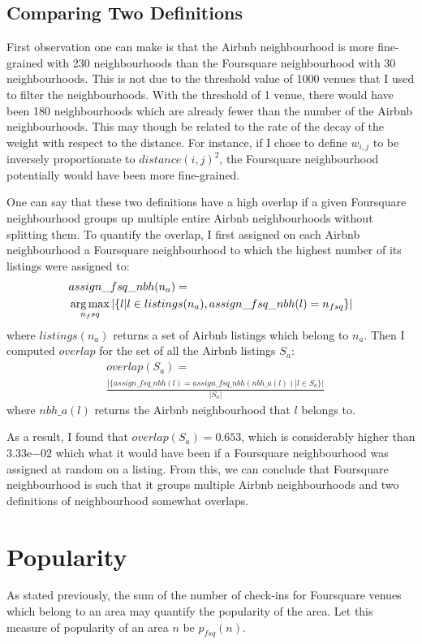 \subsection{Comparing Two Definitions}
First observation one can make is that the Airbnb neighbourhood is more fine-grained with 230 neighbourhoods than the Foursquare neighbourhood with 30 neighbourhoods. This is not due to the threshold value of 1000 venues that I used to filter the neighbourhoods. With the threshold of 1 venue, there would have been 180 neighbourhoods which are already fewer than the number of the Airbnb neighbourhoods. This may though be related to the rate of the decay of the weight with respect to the distance. For instance, if I chose to define $w_{i, j}$ to be inversely proportionate to $distance(i, j)^2$, the Foursquare neighbourhood potentially would have been more fine-grained.

One can say that these two definitions have a high overlap if a given Foursquare neighbourhood groups up multiple entire Airbnb neighbourhoods without splitting them. To quantify the overlap, I first assigned on each Airbnb neighbourhood a Foursquare neighbourhood to which the highest number of its listings were assigned to:
\begin{align*}
&assign\_fsq\_nbh(n_{a}) = \\
&\operatorname*{arg\,max}_{n_fsq} | \{ l | l \in listings(n_{a}), assign\_fsq\_nbh(l) = n_{fsq}\} |
\end{align*}
where $listings(n_{a})$ returns a set of Airbnb listings which belong to $n_{a}$. Then I computed $overlap$ for the set of all the Airbnb listings $S_a$:
\begin{align*}
&overlap(S_a) = \\
& \frac{|\{ assign\_fsq\_nbh(l) = assign\_fsq\_nbh(nbh\_a(l)) | l \in S_a \}|}{|S_a|}
\end{align*}
where $nbh\_a(l)$ returns the Airbnb neighbourhood that $l$ belongs to.

As a result, I found that $overlap(S_a) = 0.653$, which is considerably higher than $3.33\mathrm{e}{-02}$ which what it would have been if a Foursquare neighbourhood was assigned at random on a listing. From this, we can conclude that Foursquare neighbourhood is such that it groups multiple Airbnb neighbourhoods and two definitions of neighbourhood somewhat overlaps.
\section{Popularity}
As stated previously, the sum of the number of check-ins for Foursquare venues which belong to an area may quantify the popularity of the area. Let this measure of popularity of an area $n$ be $p_{fsq}(n)$.

